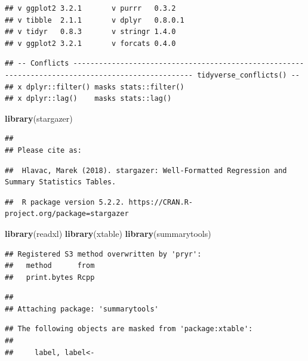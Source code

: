 \documentclass[]{article}
\newenvironment{Shaded}{\begin{snugshade}}{\end{snugshade}}
\newcommand{\KeywordTok}[1]{\textcolor[rgb]{0.13,0.29,0.53}{\textbf{#1}}}
\newcommand{\NormalTok}[1]{#1}
\begin{document}
\begin{verbatim}
## v ggplot2 3.2.1       v purrr   0.3.2  
## v tibble  2.1.1       v dplyr   0.8.0.1
## v tidyr   0.8.3       v stringr 1.4.0  
## v ggplot2 3.2.1       v forcats 0.4.0
\end{verbatim}

\begin{verbatim}
## -- Conflicts -------------------------------------------------------------------------------------------------- tidyverse_conflicts() --
## x dplyr::filter() masks stats::filter()
## x dplyr::lag()    masks stats::lag()
\end{verbatim}

\begin{Shaded}
\begin{Highlighting}[]
\KeywordTok{library}\NormalTok{(stargazer)}
\end{Highlighting}
\end{Shaded}

\begin{verbatim}
## 
## Please cite as:
\end{verbatim}

\begin{verbatim}
##  Hlavac, Marek (2018). stargazer: Well-Formatted Regression and Summary Statistics Tables.
\end{verbatim}

\begin{verbatim}
##  R package version 5.2.2. https://CRAN.R-project.org/package=stargazer
\end{verbatim}

\begin{Shaded}
\begin{Highlighting}[]
\KeywordTok{library}\NormalTok{(readxl)}
\KeywordTok{library}\NormalTok{(xtable)}
\KeywordTok{library}\NormalTok{(summarytools)}
\end{Highlighting}
\end{Shaded}

\begin{verbatim}
## Registered S3 method overwritten by 'pryr':
##   method      from
##   print.bytes Rcpp
\end{verbatim}

\begin{verbatim}
## 
## Attaching package: 'summarytools'
\end{verbatim}

\begin{verbatim}
## The following objects are masked from 'package:xtable':
## 
##     label, label<-
\end{verbatim}
\end{document}

